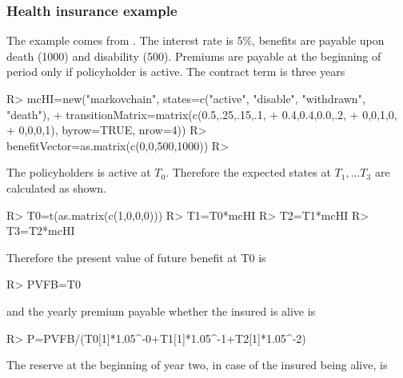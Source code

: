 \documentclass[nojss]{jss}
\begin{document}
\subsubsection{Health insurance example}

The example comes from \cite{deshmukh2012multiple}. The interest rate is 5\%, benefits are payable upon death (1000) and disability (500). Premiums are payable at the beginning of period only if policyholder is active. The contract term is three years 

\begin{Schunk}
\begin{Sinput}
R> mcHI=new("markovchain", states=c("active", "disable", "withdrawn", "death"),
+           transitionMatrix=matrix(c(0.5,.25,.15,.1,
+                                     0.4,0.4,0.0,.2,
+                                     0,0,1,0,
+                                     0,0,0,1), byrow=TRUE, nrow=4))
R> benefitVector=as.matrix(c(0,0,500,1000))
R> 
\end{Sinput}
\end{Schunk}

The policyholders is active at $T_0$. Therefore the expected states at $T_1, \ldots T_3$ are calculated as shown.

\begin{Schunk}
\begin{Sinput}
R> T0=t(as.matrix(c(1,0,0,0)))
R> T1=T0*mcHI
R> T2=T1*mcHI
R> T3=T2*mcHI
\end{Sinput}
\end{Schunk}

Therefore the present value of future benefit at T0 is

\begin{Schunk}
\begin{Sinput}
R> PVFB=T0%
\end{Sinput}
\end{Schunk}

and the yearly premium payable whether the insured is alive is 

\begin{Schunk}
\begin{Sinput}
R> P=PVFB/(T0[1]*1.05^-0+T1[1]*1.05^-1+T2[1]*1.05^-2)
\end{Sinput}
\end{Schunk}

The reserve at the beginning of year two, in case of the insured being alive, is
\end{document}
